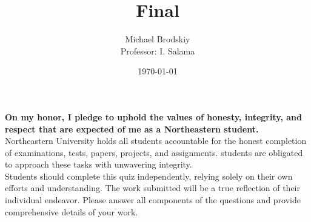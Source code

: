 


\title{Final}
\date{\today}
\author{Michael Brodskiy\\ \small Professor: I. Salama}



\maketitle

\begin{justifying}
  \textbf{On my honor, I pledge to uphold the values of honesty, integrity, and respect that are expected of me as a Northeastern student.}\\

 Northeastern University holds all students accountable for the honest completion of examinations, tests, papers, projects, and assignments. students are obligated to approach these tasks with unwavering integrity.\\

Students should complete this quiz independently, relying solely on their own efforts and understanding. The work submitted will be a true reflection of their individual endeavor. Please  answer all components of the questions and provide comprehensive details of your work.

\end{justifying}

\vspace{15pt}

